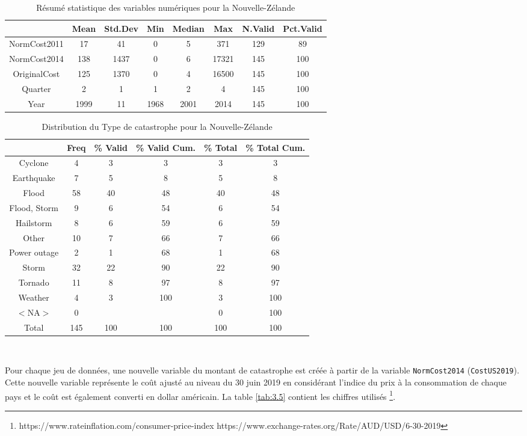 \begin{table}[ht]
\centering
\begin{tabular}{cccccccc}
  \hline
 & Mean & Std.Dev & Min & Median & Max & N.Valid & Pct.Valid \\ 
  \hline
NormCost2011 & 17 & 41 & 0 & 5 & 371 & 129 & 89 \\ 
  NormCost2014 & 138 & 1437 & 0 & 6 & 17321 & 145 & 100 \\ 
  OriginalCost & 125 & 1370 & 0 & 4 & 16500 & 145 & 100 \\ 
  Quarter & 2 & 1 & 1 & 2 & 4 & 145 & 100 \\ 
  Year & 1999 & 11 & 1968 & 2001 & 2014 & 145 & 100 \\ 
   \hline
\end{tabular}
\caption{Résumé statistique des variables numériques pour la Nouvelle-Zélande} 
\label{tab:3.3}
\end{table}%
\begin{table}[ht]
\centering
\begin{tabular}{cccccc}
  \hline
 & Freq & \% Valid & \% Valid Cum. & \% Total & \% Total Cum. \\ 
  \hline
Cyclone & 4 & 3 & 3 & 3 & 3 \\ 
  Earthquake & 7 & 5 & 8 & 5 & 8 \\ 
  Flood & 58 & 40 & 48 & 40 & 48 \\ 
  Flood, Storm & 9 & 6 & 54 & 6 & 54 \\ 
  Hailstorm & 8 & 6 & 59 & 6 & 59 \\ 
  Other & 10 & 7 & 66 & 7 & 66 \\ 
  Power outage & 2 & 1 & 68 & 1 & 68 \\ 
  Storm & 32 & 22 & 90 & 22 & 90 \\ 
  Tornado & 11 & 8 & 97 & 8 & 97 \\ 
  Weather & 4 & 3 & 100 & 3 & 100 \\ 
  $<$NA$>$ & 0 &  &  & 0 & 100 \\ 
  Total & 145 & 100 & 100 & 100 & 100 \\ 
   \hline
\end{tabular}
\caption{Distribution du Type de catastrophe pour la Nouvelle-Zélande} 
\label{tab:3.4}
\end{table}\

Pour chaque jeu de données, une nouvelle variable du montant de catastrophe est créée à partir de la variable \texttt{NormCost2014} (\texttt{CostUS2019}). Cette nouvelle variable représente le coût ajusté au niveau du 30 juin 2019 en considérant l'indice du prix à la consommation de chaque pays et le coût est également converti en dollar américain. La table \ref{tab:3.5} contient les chiffres utilisés \footnote{https://www.rateinflation.com/consumer-price-index  \newline https://www.exchange-rates.org/Rate/AUD/USD/6-30-2019}.

